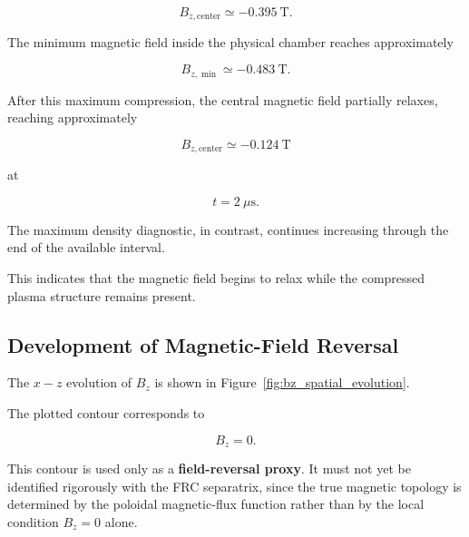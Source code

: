\documentclass[11pt,a4paper]{article}
\begin{document}
\[
B_{z,\mathrm{center}}
\simeq -0.395~\mathrm{T}.
\]

The minimum magnetic field inside the physical chamber reaches approximately

\[
B_{z,\min}
\simeq -0.483~\mathrm{T}.
\]

After this maximum compression, the central magnetic field partially relaxes,
reaching approximately

\[
B_{z,\mathrm{center}}
\simeq -0.124~\mathrm{T}
\]

at

\[
t=2~\mu\mathrm{s}.
\]

The maximum density diagnostic, in contrast, continues increasing through the
end of the available interval.

This indicates that the magnetic field begins to relax while the compressed
plasma structure remains present.


\subsection{Development of Magnetic-Field Reversal}

The \(x-z\) evolution of \(B_z\) is shown in
Figure~\ref{fig:bz_spatial_evolution}.

The plotted contour corresponds to

\[
B_z=0.
\]

This contour is used only as a \textbf{field-reversal proxy}.
It must not yet be identified rigorously with the FRC separatrix, since the
true magnetic topology is determined by the poloidal magnetic-flux function
rather than by the local condition \(B_z=0\) alone.
\end{document}
